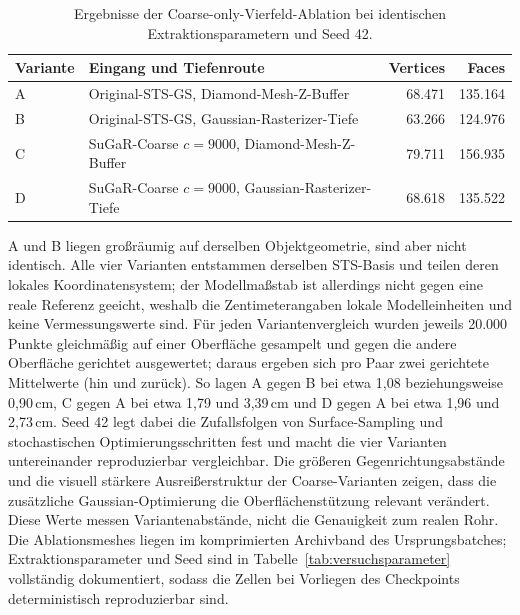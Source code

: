 \begin{table}[H]
\centering
\small
\begin{tabularx}{\textwidth}{lXrr}
\toprule
Variante & Eingang und Tiefenroute & Vertices & Faces\\
\midrule
A & Original-STS-GS, Diamond-Mesh-Z-Buffer & 68.471 & 135.164\\
B & Original-STS-GS, Gaussian-Rasterizer-Tiefe & 63.266 & 124.976\\
C & SuGaR-Coarse $c=9000$, Diamond-Mesh-Z-Buffer & 79.711 & 156.935\\
D & SuGaR-Coarse $c=9000$, Gaussian-Rasterizer-Tiefe & 68.618 & 135.522\\
\bottomrule
\end{tabularx}
\caption{Ergebnisse der Coarse-only-Vierfeld-Ablation bei identischen
Extraktionsparametern und Seed 42.}
\label{tab:mesh-ablation}
\end{table}

A und B liegen großräumig auf derselben Objektgeometrie, sind aber nicht
identisch. Alle vier Varianten entstammen derselben STS-Basis und teilen
deren lokales Koordinatensystem; der Modellmaßstab ist allerdings nicht gegen
eine reale Referenz geeicht, weshalb die Zentimeterangaben lokale
Modelleinheiten und keine Vermessungswerte sind. Für jeden Variantenvergleich
wurden jeweils 20.000 Punkte gleichmäßig auf einer Oberfläche gesampelt und
gegen die andere Oberfläche gerichtet ausgewertet; daraus ergeben sich pro
Paar zwei gerichtete Mittelwerte (hin und zurück). So lagen A gegen B bei
etwa 1,08 beziehungsweise 0,90\,cm, C gegen A bei etwa 1,79 und 3,39\,cm und
D gegen A bei etwa 1,96 und 2,73\,cm. Seed 42 legt dabei die Zufallsfolgen
von Surface-Sampling und stochastischen Optimierungsschritten fest und macht
die vier Varianten untereinander reproduzierbar vergleichbar. Die größeren
Gegenrichtungsabstände und die visuell stärkere Ausreißerstruktur der
Coarse-Varianten zeigen, dass die zusätzliche Gaussian-Optimierung die
Oberflächenstützung relevant verändert. Diese Werte messen Variantenabstände,
nicht die Genauigkeit zum realen Rohr. Die Ablationsmeshes liegen im
komprimierten Archivband des Ursprungsbatches; Extraktionsparameter und Seed
sind in Tabelle~\ref{tab:versuchsparameter} vollständig dokumentiert, sodass
die Zellen bei Vorliegen des Checkpoints deterministisch reproduzierbar sind.

